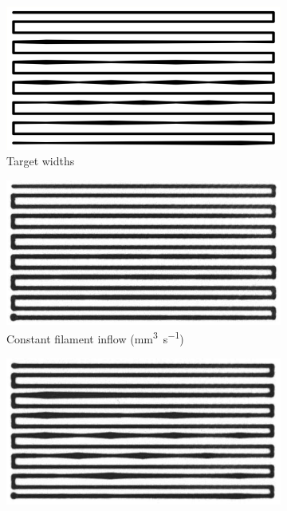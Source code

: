 \begin{figure}
\centering
\setlength{\figwidth}{0.32\columnwidth}
\setlength{\figheight}{0.5\columnwidth}
\begin{subfigure}[t]{\figwidth}\centering
\includegraphics[angle=90,height=\figheight]{sources-validation-backpressure-compensation-target.pdf}
\caption{Target widths}\label{backpressure_target}
\end{subfigure}
\begin{subfigure}[t]{\figwidth}\centering
\includegraphics[angle=90,height=\figheight]{sources-validation-zero-backpressure-compensation.png}
\caption{Constant filament inflow (\si{\milli\meter\cubed\per\second})}\label{zero_backpressure}
\end{subfigure}
\begin{subfigure}[t]{\figwidth}\centering
\includegraphics[angle=90,height=\figheight]{sources-validation-backpressure-compensation.png}

\end{subfigure}
\end{figure}
